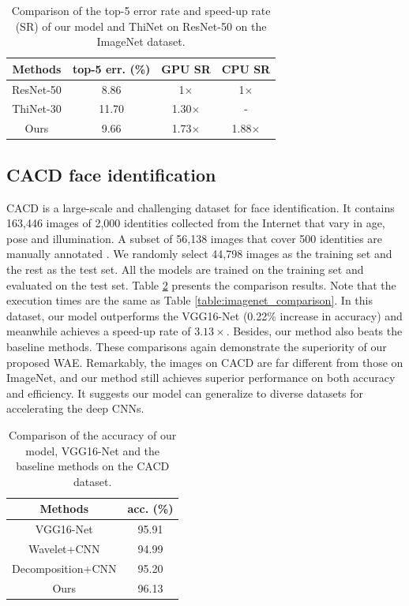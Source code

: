 \documentclass[letterpaper]{article} %
\begin{document}
\begin{table}[htbp]
\centering
\begin{tabular}{c|c|c|c}
\hline
\centering  Methods  & top-5 err. (\%) & GPU SR & CPU SR\\
\hline
\hline
ResNet-50   & 8.86 & 1$\times$  & 1$\times$ \\
ThiNet-30    & 11.70 & 1.30$\times$  & -    \\
Ours & 9.66 & 1.73$\times$ & 1.88$\times$ \\
\hline
\end{tabular}
\caption{Comparison of the top-5 error rate and speed-up rate (SR) of our model and ThiNet on ResNet-50 on the ImageNet dataset.}
\label{result:reset}
\end{table}


\subsection{CACD face identification}
CACD is a large-scale and challenging dataset for face identification. It contains 163,446 images of 2,000 identities collected from the Internet that vary in age, pose and illumination. A subset of 56,138 images that cover 500 identities are manually annotated \cite{lin2017active}. We randomly select 44,798 images as the training set and the rest as the test set. All the models are trained on the training set and evaluated on the test set. Table \ref{table:cacd_comparison} presents the comparison results. Note that the execution times are the same as Table \ref{table:imagenet_comparison}. In this dataset, our model outperforms the VGG16-Net (0.22\% increase in accuracy) and meanwhile achieves a speed-up rate of $3.13\times$. Besides, our method also beats the baseline methods. These comparisons again demonstrate the superiority of our proposed WAE. Remarkably, the images on CACD are far different from those on ImageNet, and our method still achieves superior performance on both accuracy and efficiency. It suggests our model can generalize to diverse datasets for accelerating the deep CNNs.


\begin{table}[htbp]
\centering
\begin{tabular}{c|c}
\hline
\centering  Methods  & acc. (\%) \\
\hline
\hline
VGG16-Net    & 95.91   \\
Wavelet+CNN      &   94.99  \\
Decomposition+CNN      &   95.20 \\
Ours   & 96.13   \\
\hline
\end{tabular}
\caption{Comparison of the accuracy of our model, VGG16-Net and the baseline methods on the CACD dataset.}
\label{table:cacd_comparison}
\end{table}
\end{document}
